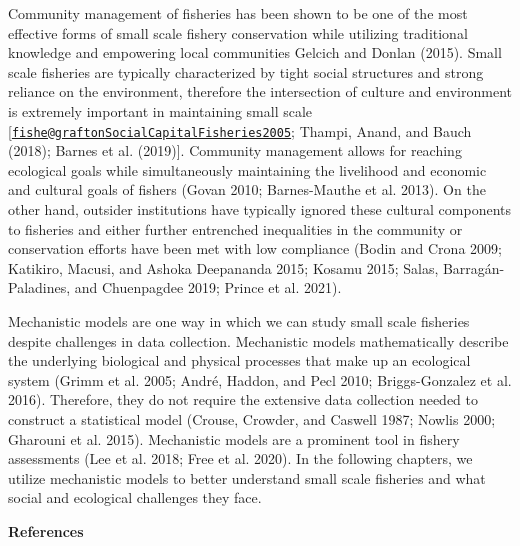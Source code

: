 \documentclass[
]{article}
\begin{document}
Community management of fisheries has been shown to be one of the most effective forms of small scale fishery conservation while utilizing traditional knowledge and empowering local communities Gelcich and Donlan (2015). Small scale fisheries are typically characterized by tight social structures and strong reliance on the environment, therefore the intersection of culture and environment is extremely important in maintaining small scale {[}\href{mailto:fishe@graftonSocialCapitalFisheries2005}{\nolinkurl{fishe@graftonSocialCapitalFisheries2005}}; Thampi, Anand, and Bauch (2018); Barnes et al. (2019){]}. Community management allows for reaching ecological goals while simultaneously maintaining the livelihood and economic and cultural goals of fishers (Govan 2010; Barnes-Mauthe et al. 2013). On the other hand, outsider institutions have typically ignored these cultural components to fisheries and either further entrenched inequalities in the community or conservation efforts have been met with low compliance (Bodin and Crona 2009; Katikiro, Macusi, and Ashoka Deepananda 2015; Kosamu 2015; Salas, Barragán-Paladines, and Chuenpagdee 2019; Prince et al. 2021).

Mechanistic models are one way in which we can study small scale fisheries despite challenges in data collection. Mechanistic models mathematically describe the underlying biological and physical processes that make up an ecological system (Grimm et al. 2005; André, Haddon, and Pecl 2010; Briggs-Gonzalez et al. 2016). Therefore, they do not require the extensive data collection needed to construct a statistical model (Crouse, Crowder, and Caswell 1987; Nowlis 2000; Gharouni et al. 2015). Mechanistic models are a prominent tool in fishery assessments (Lee et al. 2018; Free et al. 2020). In the following chapters, we utilize mechanistic models to better understand small scale fisheries and what social and ecological challenges they face.

\newpage

\textbf{References}
\end{document}
